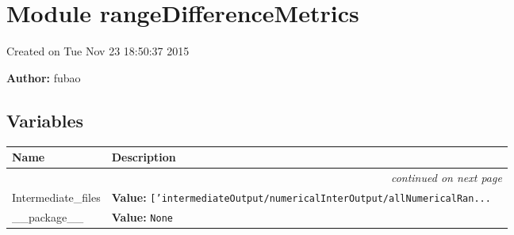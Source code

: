 %
%
%


\section{Module rangeDifferenceMetrics}

    \label{rangeDifferenceMetrics}
Created on Tue Nov  23 18:50:37 2015

\textbf{Author:} fubao





  \subsection{Variables}

    \vspace{-1cm}
\hspace{\varindent}\begin{longtable}{|p{\varnamewidth}|p{\vardescrwidth}|l}
\cline{1-2}
\cline{1-2} \centering \textbf{Name} & \centering \textbf{Description}& \\
\cline{1-2}
\endhead\cline{1-2}\multicolumn{3}{r}{\small\textit{continued on next page}}\\\endfoot\cline{1-2}
\endlastfoot\raggedright I\-n\-t\-e\-r\-m\-e\-d\-i\-a\-t\-e\-\_\-f\-i\-l\-e\-s\- & \raggedright \textbf{Value:} 
{\tt \texttt{[}\texttt{'}\texttt{intermediateOutput/numericalInterOutput/allNumericalRan}\texttt{...}}&\\
\cline{1-2}
\raggedright \_\-\_\-p\-a\-c\-k\-a\-g\-e\-\_\-\_\- & \raggedright \textbf{Value:} 
{\tt None}&\\
\cline{1-2}
\end{longtable}



